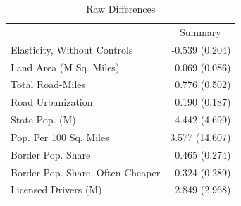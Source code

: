 \begin{table}[!h]
\caption{Raw Differences}
\centering
\begin{tabular}{ll}
\cline{1-2}
\multicolumn{1}{r}{} &
  \multicolumn{1}{c}{Summary} \\
\cline{1-2}
\multicolumn{1}{l}{Elasticity, Without Controls} &
  \multicolumn{1}{r}{-0.539 (0.204)} \\
\multicolumn{1}{l}{Land Area (M Sq. Miles)} &
  \multicolumn{1}{r}{0.069 (0.086)} \\
\multicolumn{1}{l}{Total Road-Miles} &
  \multicolumn{1}{r}{0.776 (0.502)} \\
\multicolumn{1}{l}{Road Urbanization} &
  \multicolumn{1}{r}{0.190 (0.187)} \\
\multicolumn{1}{l}{State Pop. (M)} &
  \multicolumn{1}{r}{4.442 (4.699)} \\
\multicolumn{1}{l}{Pop. Per 100 Sq. Miles} &
  \multicolumn{1}{r}{3.577 (14.607)} \\
\multicolumn{1}{l}{Border Pop. Share} &
  \multicolumn{1}{r}{0.465 (0.274)} \\
\multicolumn{1}{l}{Border Pop. Share, Often Cheaper} &
  \multicolumn{1}{r}{0.324 (0.289)} \\
\multicolumn{1}{l}{Licensed Drivers (M)} &
  \multicolumn{1}{r}{2.849 (2.968)} \\
\cline{1-2}
\end{tabular}
\end{table}
